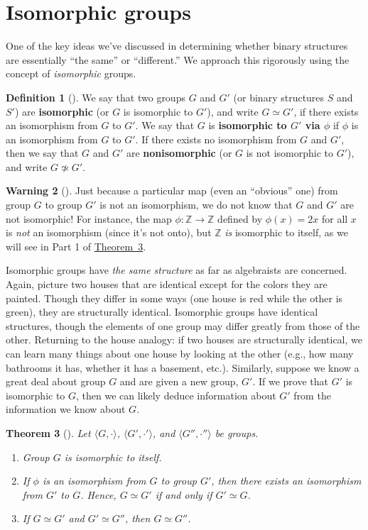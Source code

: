 \documentclass[10pt,openany,oneside]{book}
\newcommand{\terminology}[1]{\textbf{#1}}
\theoremstyle{plain}
\newtheorem{theorem}{Theorem}[section]
\theoremstyle{definition}
\newtheorem{definition}[theorem]{Definition}
\theoremstyle{definition}
\newtheorem{warning}[theorem]{Warning}
\theoremstyle{definition}
\theoremstyle{definition}
\numberwithin{equation}{section}
\def\Z{\mathbb{Z}}
\begin{document}
\section[{Isomorphic groups}]{Isomorphic groups}\label{section-12}
One of the key ideas we've discussed in determining whether binary structures are essentially ``the same'' or ``different.'' We approach this rigorously using the concept of \emph{isomorphic} groups.%
\begin{definition}[{}]\label{definition-32}
\label{notation-50}
\label{notation-51}
We say that two groups \(G\) and \(G'\) (or binary structures \(S\) and \(S'\)) are \terminology{isomorphic} (or \(G\) is isomorphic to \(G'\)), and write \(G\simeq G'\), if there exists an isomorphism from \(G\) to \(G'\). We say that \(G\) is \terminology{isomorphic to \(G'\) via \(\phi\)} if \(\phi\) is an isomorphism from \(G\) to \(G'\). If there exists no isomorphism from \(G\) and \(G'\), then we say that \(G\) and \(G'\) are \terminology{nonisomorphic} (or \(G\) is not isomorphic to \(G'\)), and write \(G\not\simeq G'\).%
\end{definition}
\begin{warning}[]\label{warning-12}
Just because a particular map (even an ``obvious'' one) from group \(G\) to group \(G'\) is not an isomorphism, we do not know that \(G\) and \(G'\) are not isomorphic! For instance, the map \(\phi: \Z\to \Z\) defined by \(\phi(x)=2x\) for all \(x\) is \emph{not} an isomorphism (since it's not onto), but \(\Z\) \emph{is} isomorphic to itself, as we will see in Part 1 of \hyperref[groupisoequiv]{Theorem~3}.%
\end{warning}
Isomorphic groups have \emph{the same structure} as far as algebraists are concerned. Again, picture two houses that are identical except for the colors they are painted. Though they differ in some ways (one house is red while the other is green), they are structurally identical. Isomorphic groups have identical structures, though the elements of one group may differ greatly from those of the other. Returning to the house analogy: if two houses are structurally identical, we can learn many things about one house by looking at the other (e.g., how many bathrooms it has, whether it has a basement, etc.). Similarly, suppose we know a great deal about group \(G\) and are given a new group, \(G'\). If we prove that \(G'\) is isomorphic to \(G\), then we can likely deduce information about \(G'\) from the information we know about \(G\).%
\begin{theorem}[{}]\label{groupisoequiv}
Let \(\langle G,\cdot\rangle\), \(\langle G',\cdot'\rangle\), and \(\langle G'',\cdot''\rangle\) be groups. \leavevmode%
\begin{enumerate}
\item\hypertarget{li-145}{}Group \(G\) is isomorphic to itself.%
\item\hypertarget{li-146}{}If \(\phi\) is an isomorphism from \(G\) to group \(G'\), then there exists an isomorphism from \(G'\) to \(G\). Hence, \(G\simeq G'\) if and only if \(G'\simeq G\).%
\item\hypertarget{li-147}{}If \(G\simeq G'\) and \(G'\simeq G''\), then \(G\simeq G''\).%
\end{enumerate}
%
\end{theorem}
\end{document}
